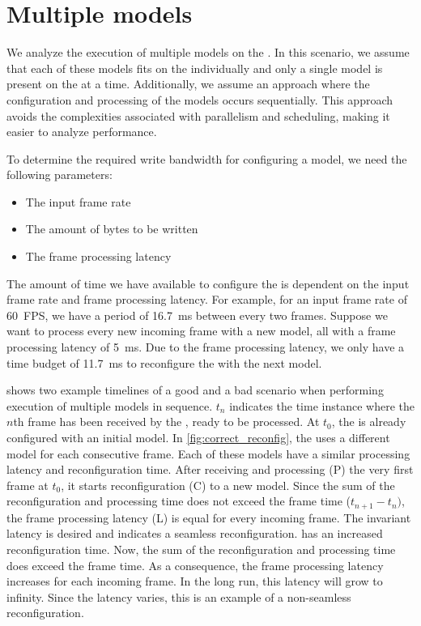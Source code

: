 \section{Multiple models}
We analyze the execution of multiple models on the \graicore{}.
In this scenario, we assume that each of these models fits on the \graicore{} individually and only a single model is present on the \graicore{} at a time.
Additionally, we assume an approach where the configuration and processing of the models occurs sequentially.
This approach avoids the complexities associated with parallelism and scheduling, making it easier to analyze performance.

To determine the required write bandwidth for configuring a model, we need the following parameters:
\begin{itemize}
    \item The input frame rate
    \item The amount of bytes to be written
    \item The frame processing latency
\end{itemize}

The amount of time we have available to configure the \graicore{} is dependent on the input frame rate and frame processing latency.
For example, for an input frame rate of \SI{60}{FPS}, we have a period of \SI{16.7}{ms} between every two frames.
Suppose we want to process every new incoming frame with a new model, all with a frame processing latency of \SI{5}{ms}. 
Due to the frame processing latency, we only have a time budget of \SI{11.7}{ms} to reconfigure the \graicore{} with the next model.

 shows two example timelines of a good and a bad scenario when performing execution of multiple models in sequence.
$t_n$ indicates the time instance where the $n$th frame has been received by the \graicore{}, ready to be processed.
At $t_0$, the \graicore{} is already configured with an initial model.
In \cref{fig:correct_reconfig}, the \graicore{} uses a different model for each consecutive frame.
Each of these models have a similar processing latency and reconfiguration time.
After receiving and processing (P) the very first frame at $t_0$, it starts reconfiguration (C) to a new model.
Since the sum of the reconfiguration and processing time does not exceed the frame time ($t_{n+1} - t_{n})$, the frame processing latency (L) is equal for every incoming frame.
The invariant latency is desired and indicates a seamless reconfiguration.
 has an increased reconfiguration time.
Now, the sum of the reconfiguration and processing time does exceed the frame time.
As a consequence, the frame processing latency increases for each incoming frame.
In the long run, this latency will grow to infinity.
Since the latency varies, this is an example of a non-seamless reconfiguration.

